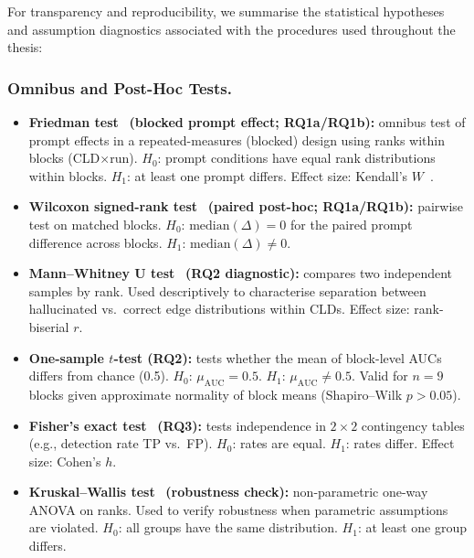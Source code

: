 For transparency and reproducibility, we summarise the statistical hypotheses and assumption diagnostics associated with the procedures used throughout the thesis:

\subsubsection{Omnibus and Post-Hoc Tests.}
\begin{itemize}[noitemsep]
    \item \textbf{Friedman test}~\cite{friedman1937use} \textbf{(blocked prompt effect; RQ1a/RQ1b):} omnibus test of prompt effects in a repeated-measures (blocked) design using ranks within blocks (CLD$\times$run). $H_0$: prompt conditions have equal rank distributions within blocks. $H_1$: at least one prompt differs. Effect size: Kendall's $W$~\cite{kendall1939problem}.
    \item \textbf{Wilcoxon signed-rank test}~\cite{wilcoxon1945individual} \textbf{(paired post-hoc; RQ1a/RQ1b):} pairwise test on matched blocks. $H_0$: $\mathrm{median}(\Delta)=0$ for the paired prompt difference across blocks. $H_1$: $\mathrm{median}(\Delta)\neq 0$.
    \item \textbf{Mann--Whitney U test}~\cite{mann1947test} \textbf{(RQ2 diagnostic):} compares two independent samples by rank. Used descriptively to characterise separation between hallucinated vs.\ correct edge distributions within CLDs. Effect size: rank-biserial $r$.
    \item \textbf{One-sample $t$-test (RQ2):} tests whether the mean of block-level AUCs differs from chance (0.5). $H_0$: $\mu_{\text{AUC}}=0.5$. $H_1$: $\mu_{\text{AUC}}\neq 0.5$. Valid for $n=9$ blocks given approximate normality of block means (Shapiro--Wilk $p>0.05$).
    \item \textbf{Fisher's exact test}~\cite{fisher1922interpretation} \textbf{(RQ3):} tests independence in $2\times2$ contingency tables (e.g., detection rate TP vs.\ FP). $H_0$: rates are equal. $H_1$: rates differ. Effect size: Cohen's $h$.
    \item \textbf{Kruskal--Wallis test}~\cite{kruskal1952use} \textbf{(robustness check):} non-parametric one-way ANOVA on ranks. Used to verify robustness when parametric assumptions are violated. $H_0$: all groups have the same distribution. $H_1$: at least one group differs.
\end{itemize}

